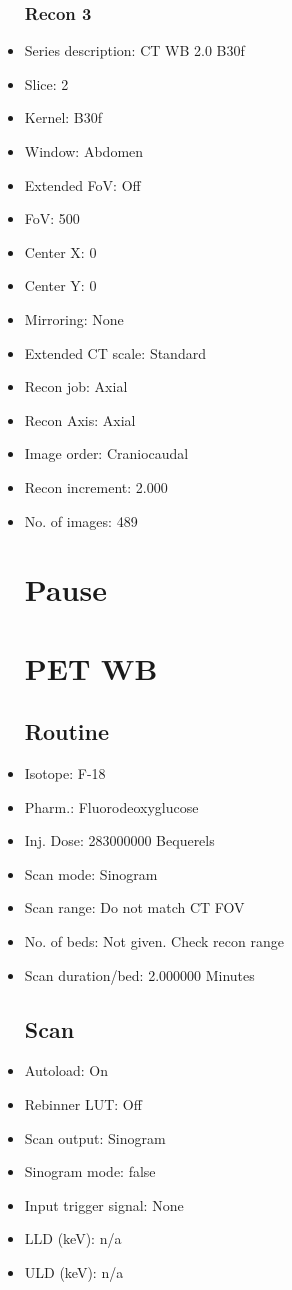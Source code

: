 \documentclass[12pt]{article}
\begin{document}
\begin{itemize}[noitemsep]
\subsubsection{Recon 3}
\item Series description: CT WB 2.0 B30f
\item Slice: 2
\item Kernel: B30f
\item Window: Abdomen
\item Extended FoV: Off
\item FoV: 500
\item Center X: 0
\item Center Y: 0
\item Mirroring: None
\item Extended CT scale: Standard
\item Recon job: Axial
\item Recon Axis: Axial
\item Image order: Craniocaudal
\item Recon increment: 2.000
\item No. of images: 489
\section{Pause}
\section{PET WB}\subsection{Routine}
\item Isotope: F-18
\item Pharm.: Fluorodeoxyglucose
\item Inj. Dose: 283000000 Bequerels
\item Scan mode: Sinogram
\item Scan range: Do not match CT FOV
\item No. of beds: Not given. Check recon range
\item Scan duration/bed: 2.000000 Minutes
\subsection{Scan}
\item Autoload: On
\item Rebinner LUT: Off
\item Scan output: Sinogram
\item Sinogram mode: false
\item Input trigger signal: None
\item LLD (keV): n/a
\item ULD (keV): n/a

\end{itemize}
\end{document}
